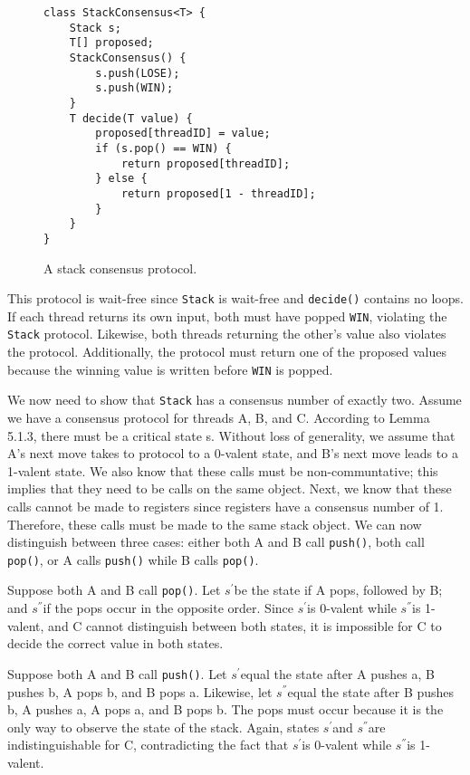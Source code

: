 \documentclass[a4paper,10pt]{article}
\newcommand{\Sp}{$s^{'}$}
\newcommand{\Spp}{$s^{''}$}
\begin{document}
\begin{figure}
\begin{lstlisting}
class StackConsensus<T> {
    Stack s;
    T[] proposed;
    StackConsensus() {
        s.push(LOSE);
        s.push(WIN);
    }
    T decide(T value) {
        proposed[threadID] = value;
        if (s.pop() == WIN) {
            return proposed[threadID];
        } else {
            return proposed[1 - threadID];
        }
    }
}
\end{lstlisting}
\caption{A stack consensus protocol.}
\label{fig:stackconsensus}
\end{figure}

This protocol is wait-free since \lstinline|Stack| is wait-free and \lstinline|decide()| contains no loops. If each thread returns its own input, both must have popped \lstinline|WIN|, violating the \lstinline|Stack| protocol. Likewise, both threads returning the other's value also violates the protocol. Additionally, the protocol must return one of the proposed values because the winning value is written before \lstinline|WIN| is popped.

We now need to show that \lstinline|Stack| has a consensus number of exactly two. Assume we have a consensus protocol for threads A, B, and C. According to Lemma 5.1.3, there must be a critical state s. Without loss of generality, we assume that A's next move takes to protocol to a 0-valent state, and B's next move leads to a 1-valent state. We also know that these calls must be non-communtative; this implies that they need to be calls on the same object. Next, we know that these calls cannot be made to registers since registers have a consensus number of 1. Therefore, these calls must be made to the same stack object. We can now distinguish between three cases: either both A and B call \lstinline|push()|, both call \lstinline|pop()|, or A calls \lstinline|push()| while B calls \lstinline|pop()|.

Suppose both A and B call \lstinline|pop()|. Let \Sp be the state if A pops, followed by B; and \Spp if the pops occur in the opposite order. Since \Sp is 0-valent while \Spp is 1-valent, and C cannot distinguish between both states, it is impossible for C to decide the correct value in both states.

Suppose both A and B call \lstinline|push()|. Let \Sp equal the state after A pushes a, B pushes b, A pops b, and B pops a. Likewise, let \Spp equal the state after B pushes b, A pushes a, A pops a, and B pops b. The pops must occur because it is the only way to observe the state of the stack. Again, states \Sp and \Spp are indistinguishable for C, contradicting the fact that \Sp is 0-valent while \Spp is 1-valent.
\end{document}
